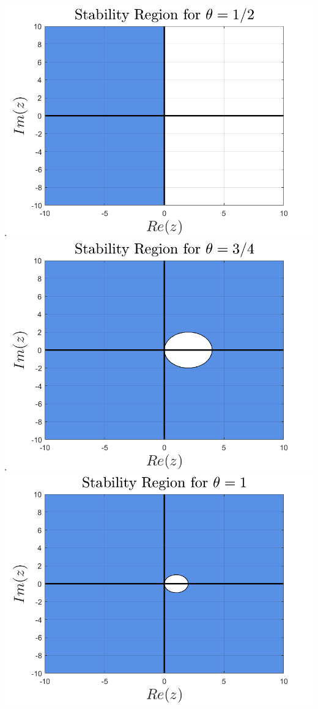 \documentclass{article}
\begin{document}
\begin{itemize}
\begin{center}
        \includegraphics[scale = 0.25]{stabilityregion0.5.png}
        \includegraphics[scale = 0.25]{stabilityregion0.75.png}
        \newline
        \includegraphics[scale = 0.25]{stabilityregion1.png}

\end{center}
\end{itemize}
\end{document}
